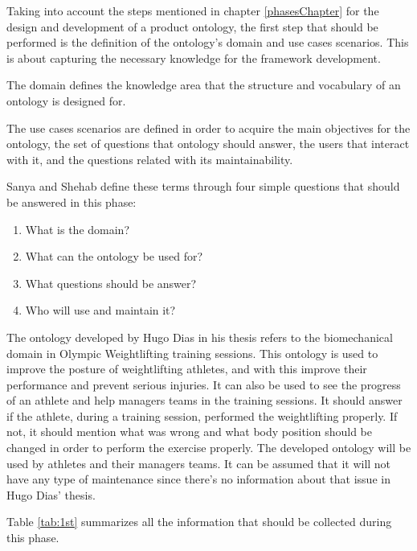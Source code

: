Taking into account the steps mentioned in chapter \ref{phasesChapter} for the design and development of a product ontology, the first step that should be performed is the definition of the ontology's domain and use cases scenarios. This is about capturing the necessary knowledge for the framework development.
\par The domain defines the knowledge area that the structure and vocabulary of an ontology is designed for.
\par The use cases scenarios are defined in order to acquire the main objectives for the ontology, the set of questions that ontology should answer, the users that interact with it, and the questions related with its maintainability.
\par Sanya and Shehab \cite{AeroArticle} define these terms through four simple questions that should be answered in this phase:
\begin{enumerate}
\item What is the domain?
\item What can the ontology be used for?
\item What questions should be answer?
\item Who will use and maintain it?
\end{enumerate}

\par The ontology developed by Hugo Dias \cite{HugoThesis} in his thesis refers to the biomechanical domain in Olympic Weightlifting training sessions.
This ontology is used to improve the posture of weightlifting athletes, and with this improve their performance and prevent serious injuries. It can also be used to see the progress of an athlete and help managers teams in the training sessions.
It should answer if the athlete, during a training session, performed the weightlifting properly. If not, it should mention what was wrong and what body position should be changed in order to perform the exercise properly.
The developed ontology will be used by athletes and their managers teams. It can be assumed that it will not have any type of maintenance since there's no information about that issue in Hugo Dias' \cite{HugoThesis} thesis. 
\par Table \ref{tab:1st} summarizes all the information that should be collected during this phase. 

